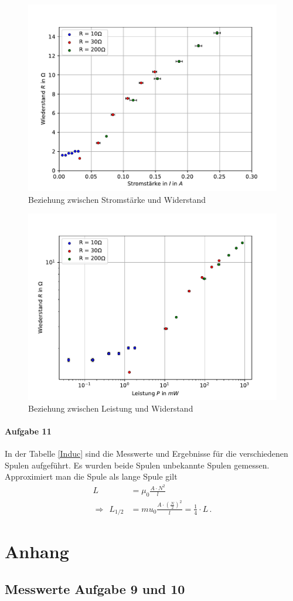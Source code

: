 \documentclass[11pt, a4paper]{article}
\begin{document}
    \begin{figure}
        \centering
        \includegraphics[width=\textwidth]{amp.pdf}
        \caption{Beziehung zwischen Stromstärke und Widerstand}
        \label{amp}
    \end{figure}
    \begin{figure}
        \centering
        \includegraphics[width=\textwidth]{pow.pdf}
        \caption{Beziehung zwischen Leistung und Widerstand}
        \label{pow}
    \end{figure}

    \paragraph{Aufgabe 11}
    In der Tabelle \ref{Induc} sind die Messwerte und Ergebnisse für die verschiedenen Spulen aufgeführt. Es wurden beide Spulen unbekannte Spulen gemessen. Approximiert man die Spule als lange Spule gilt
    \begin{align}
        L &= \mu_0 \frac{A\cdot N^2}{l} \\
        \Rightarrow \ \ L_{1/2} &= mu_0 \frac{A\cdot \left(\frac{N}{2}\right)^2}{l} = \frac{1}{4} \cdot L \,.
    \end{align}

    \section{Anhang}
    \subsection{Messwerte Aufgabe 9 und 10}
    

    
    
\end{document}
